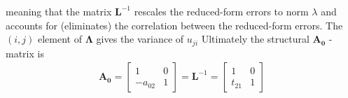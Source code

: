 \documentclass[a4paper,11pt,listof=nochaptergap,oneside,pointednumbers,bibtotoc,bigheadings,liststotoc]{scrbook}
\newcommand{\vect}[1]{\boldsymbol{\mathbf{#1}}}
\begin{document}
meaning that the matrix $\vect{L}^{-1}$ rescales the reduced-form errors to norm $\lambda$ and accounts for (eliminates) the correlation between the reduced-form errors. The $(i, j)$ element of $\vect{\Lambda}$ gives the variance of $u_{ji}$ Ultimately the structural $\vect{A_0}$ - matrix is
\begin{equation} \label{eq:svar23}
\begin{split}
	\vect{A_0} = \begin{bmatrix}
    					1 & 0 \\
					-a_{02} & 1
 					\end{bmatrix} = 
					\vect{L}^{-1} = 
						\begin{bmatrix}
    						1 & 0 \\
						t_{21} & 1
 						\end{bmatrix}
\end{split}								
\end{equation}
\end{document}
